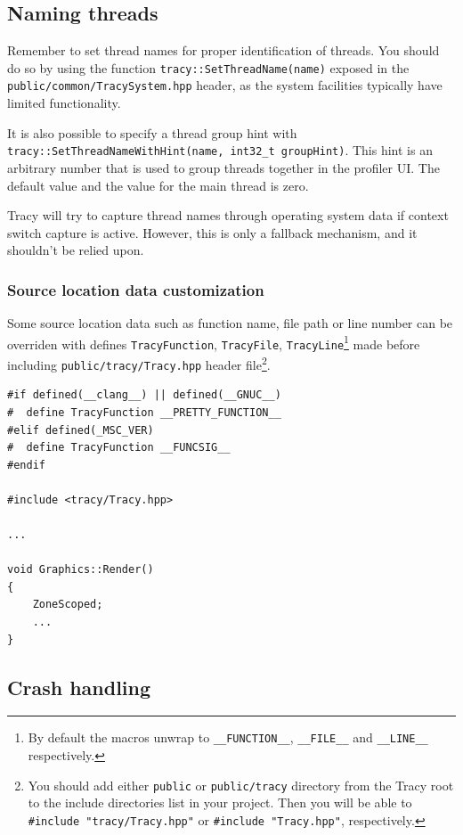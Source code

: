 \documentclass[hidelinks,titlepage,a4paper,twoside]{article}
\begin{document}
\subsection{Naming threads}
\label{namingthreads}

Remember to set thread names for proper identification of threads. You should do so by using the function \texttt{tracy::SetThreadName(name)} exposed in the \texttt{public/common/TracySystem.hpp} header, as the system facilities typically have limited functionality.

It is also possible to specify a thread group hint with \texttt{tracy::SetThreadNameWithHint(name, int32\_t groupHint)}. This hint is an arbitrary number that is used to group threads together in the profiler UI. The default value and the value for the main thread is zero.

Tracy will try to capture thread names through operating system data if context switch capture is active. However, this is only a fallback mechanism, and it shouldn't be relied upon.

\subsubsection{Source location data customization}

Some source location data such as function name, file path or line number can be overriden with defines \texttt{TracyFunction}, \texttt{TracyFile}, \texttt{TracyLine}\footnote{By default the macros unwrap to \texttt{\_\_FUNCTION\_\_}, \texttt{\_\_FILE\_\_} and \texttt{\_\_LINE\_\_} respectively.} made before including \texttt{public/tracy/Tracy.hpp} header file\footnote{You should add either \texttt{public} or \texttt{public/tracy} directory from the Tracy root to the include directories list in your project. Then you will be able to \texttt{\#include "tracy/Tracy.hpp"} or \texttt{\#include "Tracy.hpp"}, respectively.}.

\begin{lstlisting}
#if defined(__clang__) || defined(__GNUC__)
#  define TracyFunction __PRETTY_FUNCTION__
#elif defined(_MSC_VER)
#  define TracyFunction __FUNCSIG__
#endif

#include <tracy/Tracy.hpp>

...

void Graphics::Render()
{
    ZoneScoped;
    ...
}
\end{lstlisting}

\subsection{Crash handling}
\label{crashhandling}
\end{document}
